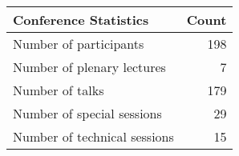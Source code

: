 \begin{table}[h]
\centering
\begin{tabular}{|l|r|}
\hline
\textbf{Conference Statistics} & \textbf{Count} \\
\hline
Number of participants & 198 \\
\hline
Number of plenary lectures & 7 \\
\hline
Number of talks & 179 \\
\hline
Number of special sessions & 29 \\
\hline
Number of technical sessions & 15 \\
\hline
\end{tabular}
\end{table}
